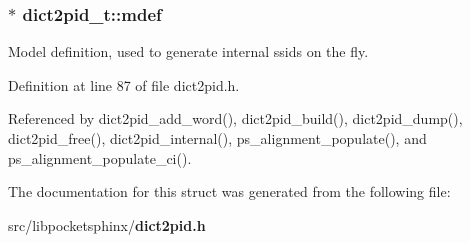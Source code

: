 \subsubsection[{mdef}]{$\ast$ dict2pid\-\_\-t\-::mdef}\label{structdict2pid__t_ab0dcb283a0cf5ad40836bc418fd535b3}


Model definition, used to generate internal ssids on the fly. 



Definition at line 87 of file dict2pid.\-h.



Referenced by dict2pid\-\_\-add\-\_\-word(), dict2pid\-\_\-build(), dict2pid\-\_\-dump(), dict2pid\-\_\-free(), dict2pid\-\_\-internal(), ps\-\_\-alignment\-\_\-populate(), and ps\-\_\-alignment\-\_\-populate\-\_\-ci().



The documentation for this struct was generated from the following file\-:\begin{DoxyCompactItemize}
\item 
src/libpocketsphinx/{\bf dict2pid.\-h}\end{DoxyCompactItemize}
